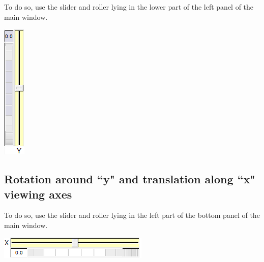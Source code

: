 \begin{minipage}{0.7\textwidth}
To do so, use the slider and roller lying in the lower part of the left panel of the
main window.
\end{minipage}    
\begin{minipage}{0.25\textwidth}\centering
  \includegraphics{images/Icons/y_rot.png}
 \end{minipage}   

\subsection{Rotation around ``y" and translation along ``x" viewing axes}


\begin{minipage}{0.5\textwidth}
To do so, use the slider and roller lying in the left part of the bottom panel of the
main window.
\end{minipage}    
\begin{minipage}{0.4\textwidth}\centering
  \includegraphics{images/Icons/z_rot.png}
 \end{minipage}   

